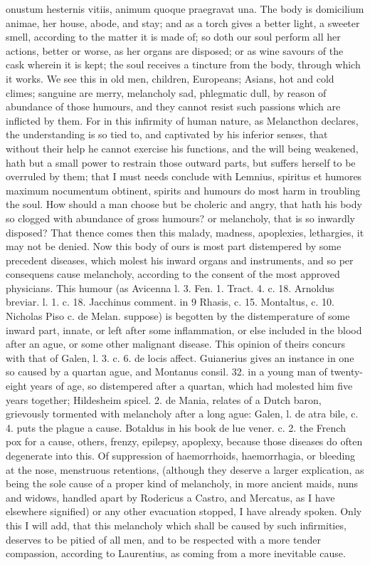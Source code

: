 {onustum hesternis vitiis, animum quoque praegravat una. The body is
domicilium animae, her house, abode, and stay; and as a torch gives a
better light, a sweeter smell, according to the matter it is made of;
so doth our soul perform all her actions, better or worse, as her
organs are disposed; or as wine savours of the cask wherein it is kept;
the soul receives a tincture from the body, through which it works. We
see this in old men, children, Europeans; Asians, hot and cold climes;
sanguine are merry, melancholy sad, phlegmatic dull, by reason of
abundance of those humours, and they cannot resist such passions which
are inflicted by them. For in this infirmity of human nature, as
Melancthon declares, the understanding is so tied to, and captivated by
his inferior senses, that without their help he cannot exercise his
functions, and the will being weakened, hath but a small power to
restrain those outward parts, but suffers herself to be overruled by
them; that I must needs conclude with Lemnius, spiritus et humores
maximum nocumentum obtinent, spirits and humours do most harm in
troubling the soul. How should a man choose but be choleric and
angry, that hath his body so clogged with abundance of gross humours?
or melancholy, that is so inwardly disposed? That thence comes then
this malady, madness, apoplexies, lethargies, \etc{} it may not be denied.
Now this body of ours is most part distempered by some precedent
diseases, which molest his inward organs and instruments, and so per
consequens cause melancholy, according to the consent of the most
approved physicians. This humour (as Avicenna l. 3. Fen. 1.
Tract. 4. c. 18. Arnoldus breviar. l. 1. c. 18. Jacchinus comment. in 9
Rhasis, c. 15. Montaltus, c. 10. Nicholas Piso c. de Melan. \etc{}
suppose) is begotten by the distemperature of some inward part, innate,
or left after some inflammation, or else included in the blood after an
ague, or some other malignant disease. This opinion of theirs
concurs with that of Galen, l. 3. c. 6. de locis affect. Guianerius
gives an instance in one so caused by a quartan ague, and Montanus
consil. 32. in a young man of twenty-eight years of age, so distempered
after a quartan, which had molested him five years together; Hildesheim
spicel. 2. de Mania, relates of a Dutch baron, grievously tormented
with melancholy after a long ague: Galen, l. de atra bile, c. 4.
puts the plague a cause. Botaldus in his book de lue vener. c. 2. the
French pox for a cause, others, frenzy, epilepsy, apoplexy, because
those diseases do often degenerate into this. Of suppression of
haemorrhoids, haemorrhagia, or bleeding at the nose, menstruous
retentions, (although they deserve a larger explication, as being the
sole cause of a proper kind of melancholy, in more ancient maids, nuns
and widows, handled apart by Rodericus a Castro, and Mercatus, as I
have elsewhere signified) or any other evacuation stopped, I have
already spoken. Only this I will add, that this melancholy which shall
be caused by such infirmities, deserves to be pitied of all men, and to
be respected with a more tender compassion, according to Laurentius, as
coming from a more inevitable cause.

}
